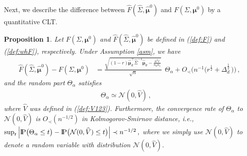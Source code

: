 \documentclass[12pt]{article}
\numberwithin{equation}{section}
\newtheorem{prop}{Proposition}
\theoremstyle{remark}
\newcommand{\p}{{\rm I}\kern-0.18em{\rm P}}
\newcommand{\1}{{\rm 1}\kern-0.24em{\rm I}}
\begin{document}
Next, we describe the difference between $\widehat{F}(\widehat\Sigma, \hat{\bm{\mu}}^0)$ and $F(\Sigma, {\bm{\mu}}^0)$ by a quantitative CLT.


\begin{prop}\label{prop.asym_dist}
Let $F(\Sigma, {\bm{\mu}}^0)$ and $\widehat{F}(\widehat\Sigma, \hat{\bm{\mu}}^0)$   be defined in (\ref{def:F}) and (\ref{def:whF}),  respectively. Under Assumption \ref{asm}, we have
\begin{align}\label{repre:sF-F}
\quad \widehat{F}(\widehat\Sigma, \hat{\bm{\mu}}^0)- F(\Sigma, {\bm{\mu}}^0)
&= \frac {\sqrt{ (1-r)  \hat{\bm{\mu}}_d^{\top}  \widehat\Sigma^{-1} \hat{\bm{\mu}}_d- \frac{n^2r}{n_0n_1}}}{\sqrt n}\, \; {\varTheta_{\alpha}}+  O_\prec \Big(n^{-1} \big(r^{\frac 12} + \varDelta_d^{\frac 12}\,  \big)\Big) \,, 
\end{align}
and the random part ${\varTheta_{\alpha}}$ satisfies
\begin{align*}
{\varTheta_{\alpha}}\simeq \mathcal{N}(0, \widehat {V})\,,
\end{align*}
where  $\widehat {V}$ was defined in (\ref{def:V123}).
Furthermore, the convergence rate of ${\varTheta_{\alpha}}$ to $\mathcal{N}(0, \widehat {V})$ is $O_\prec(n^{-1/2})$ in Kolmogorov-Smirnov distance, i.e., $\sup_{t}\Big|\p\big(\Theta_\alpha\leq t\big)-\p\big( \mathcal{N}(0, \widehat {V})\leq t\big)\Big|\prec  n^{-1/2}\,, $
where we simply use $ \mathcal{N}(0, \widehat {V})$ to denote a random variable with distribution $ \mathcal{N}(0, \widehat {V})$. 

\end{prop}
\end{document}
